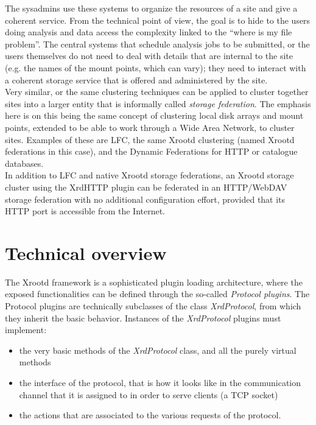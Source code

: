 \documentclass[12pt]{article} %
\begin{document}
The sysadmins use these systems to organize the resources of a site and give a coherent service.
From the technical point of view, the goal is to hide to the users doing analysis and data access the complexity linked to the ``where is my file problem''. The central systems that schedule analysis jobs to be submitted, or the users themselves do not need to deal with details that are internal to the site (e.g. the names of the mount points, which can vary); they need to interact with a coherent storage service that is offered and administered by the site.\\

Very similar, or the same clustering techniques can be applied to cluster together sites into a larger entity that is informally called \textit{storage federation}. The emphasis here is on this being the same concept of clustering local disk arrays and mount points, extended to be able to work through a Wide Area Network, to cluster sites. Examples of these are LFC, the same Xrootd clustering (named Xrootd federations in this case), and the Dynamic Federations for HTTP or catalogue databases.\\

In addition to LFC and native Xrootd storage federations, an Xrootd storage cluster using the XrdHTTP plugin can be federated in an HTTP/WebDAV storage federation with no additional configuration effort, provided that its HTTP port is accessible from the Internet.

\section{Technical overview}

The Xrootd framework is a sophisticated plugin loading architecture, where the exposed functionalities can be defined through the so-called \textit{Protocol plugins}. The Protocol plugins are technically subclasses of the class \textit{XrdProtocol}, from which they inherit the basic behavior.
Instances of the \textit{XrdProtocol} plugins must implement:
\begin{itemize}
\item the very basic methods of the \textit{XrdProtocol} class, and all the purely virtual methods
\item the interface of the protocol, that is how it looks like in the communication channel that it is assigned to in order to serve clients (a TCP socket)
\item the actions that are associated to the various requests of the protocol.
\end{itemize}
\end{document}
